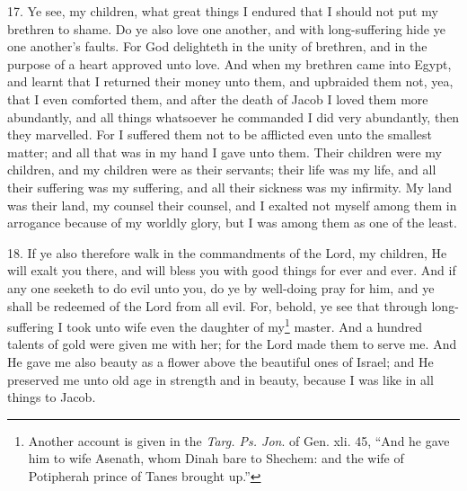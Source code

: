 17. Ye see, my children, what great things I endured that I should not put my brethren to shame. Do ye also love one another, and with long-suffering hide ye one another’s faults. For God delighteth in the unity of brethren, and in the purpose of a heart approved unto love. And when my brethren came into Egypt, and learnt that I returned their money unto them, and upbraided them not, yea, that I even comforted them, and after the death of Jacob I loved them more abundantly, and all things whatsoever he commanded I did very abundantly, then they marvelled. For I suffered them not to be afflicted even unto the smallest matter; and all that was in my hand I gave unto them. Their children were my children, and my children were as their servants; their life was my life, and all their suffering was my suffering, and all their sickness was my infirmity. My land was their land, my counsel their counsel, and I exalted not myself among them in arrogance because of my worldly glory, but I was among them as one of the least.

18. If ye also therefore walk in the commandments of the Lord, my children, He will exalt you there, and will bless you with good things for ever and ever. And if any one seeketh to do evil unto you, do ye by well-doing pray for him, and ye shall be redeemed of the Lord from all evil. For, behold, ye see that through long-suffering I took unto wife even the daughter of my\footnote{Another account is given in the \emph{Targ. Ps. Jon}. of Gen. xli. 45, “And he gave him to wife Asenath, whom Dinah bare to Shechem: and the wife of Potipherah prince of Tanes brought up.”} master. And a hundred talents of gold were given me with her; for the Lord made them to serve me. And He gave me also beauty as a flower above the beautiful ones of Israel; and He preserved me unto old age in strength and in beauty, because I was like in all things to Jacob.

